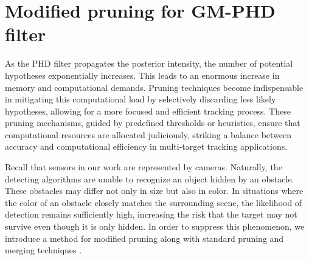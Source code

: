 \section{Modified pruning for GM-PHD filter}
As the PHD filter propagates the posterior intensity, the number of potential hypotheses exponentially increases. This leads to an enormous increase in memory and computational demands. Pruning techniques become indispensable in mitigating this computational load by selectively discarding less likely hypotheses, allowing for a more focused and efficient tracking process. These pruning mechanisms, guided by predefined thresholds or heuristics, ensure that computational resources are allocated judiciously, striking a balance between accuracy and computational efficiency in multi-target tracking applications.

Recall that sensors in our work are represented by cameras. Naturally, the detecting algorithms are unable to
recognize an object hidden by an obstacle. These obstacles may differ not only in size but also in color. In
situations where the color of an obstacle closely matches the surrounding scene, the likelihood of detection remains
sufficiently high, increasing the risk that the target may not survive even though it is only hidden. In order to suppress this phenomenon, we introduce a method for modified pruning along with standard pruning and merging techniques \cite{VoMaPHD2006}.

